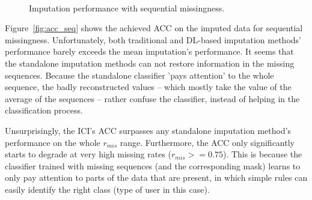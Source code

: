 				\begin{figure}[ht]
					\centering
					 \\
					\caption[Imputation performance with sequential missingness]{Imputation performance with sequential missingness.}
				\end{figure}
				
				Figure~\ref{fig:acc_seq} shows the achieved \ac{ACC} on the imputed data for sequential missingness.
				Unfortunately, both traditional and \ac{DL}-based imputation methods' performance barely exceeds the mean imputation's performance.
				It seems that the standalone imputation methods can not restore information in the missing sequences.
				Because the standalone classifier 'pays attention' to the whole sequence, the badly reconstructed values -- which mostly take the value of the average of the sequences -- rather confuse the classifier, instead of helping in the classification process.
				
				Unsurprisingly, the \ac{ICI}'s \ac{ACC} surpasses any standalone imputation method's performance on the whole $r_{mis}$ range.
				Furthermore, the \ac{ACC} only significantly starts to degrade at very high missing rates ($r_{mis} >= 0.75$).
				This is because the classifier trained with missing sequences (and the corresponding mask) learns to only pay attention to parts of the data that are present, in which simple rules can easily identify the right class (type of user in this case).
				
